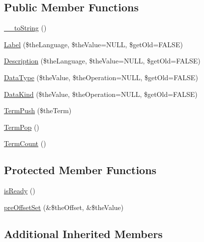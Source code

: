 \subsection*{Public Member Functions}
\begin{DoxyCompactItemize}
\item 
\hyperlink{class_ontology_wrapper_1_1_tag_object_aa942610424d0d9ccd25f77fa2d5ac175}{\-\_\-\-\_\-to\-String} ()
\item 
\hyperlink{class_ontology_wrapper_1_1_tag_object_aff2f456246175999477d30308ba46f5d}{Label} (\$the\-Language, \$the\-Value=N\-U\-L\-L, \$get\-Old=F\-A\-L\-S\-E)
\item 
\hyperlink{class_ontology_wrapper_1_1_tag_object_a3af9d817a489a0adfa3bbaf6b1a3484a}{Description} (\$the\-Language, \$the\-Value=N\-U\-L\-L, \$get\-Old=F\-A\-L\-S\-E)
\item 
\hyperlink{class_ontology_wrapper_1_1_tag_object_aafaa4544bcec86e5d788ef360128d7fb}{Data\-Type} (\$the\-Value, \$the\-Operation=N\-U\-L\-L, \$get\-Old=F\-A\-L\-S\-E)
\item 
\hyperlink{class_ontology_wrapper_1_1_tag_object_a4e45b95407e911cc4dfdce3c5384ee0c}{Data\-Kind} (\$the\-Value, \$the\-Operation=N\-U\-L\-L, \$get\-Old=F\-A\-L\-S\-E)
\item 
\hyperlink{class_ontology_wrapper_1_1_tag_object_af1f5bda567cfd03e3098faf68b34ff1b}{Term\-Push} (\$the\-Term)
\item 
\hyperlink{class_ontology_wrapper_1_1_tag_object_adb3d32d6ac4285202f4b2e725e04b946}{Term\-Pop} ()
\item 
\hyperlink{class_ontology_wrapper_1_1_tag_object_aa1ffca0b0a8b996910eaf8a5645b8d6e}{Term\-Count} ()
\end{DoxyCompactItemize}
\subsection*{Protected Member Functions}
\begin{DoxyCompactItemize}
\item 
\hyperlink{class_ontology_wrapper_1_1_tag_object_a5e348ec21f6570dfd4024ffaa9dfb2e2}{is\-Ready} ()
\item 
\hyperlink{class_ontology_wrapper_1_1_tag_object_a052746406bd482f55c790d5af4132899}{pre\-Offset\-Set} (\&\$the\-Offset, \&\$the\-Value)
\end{DoxyCompactItemize}
\subsection*{Additional Inherited Members}



